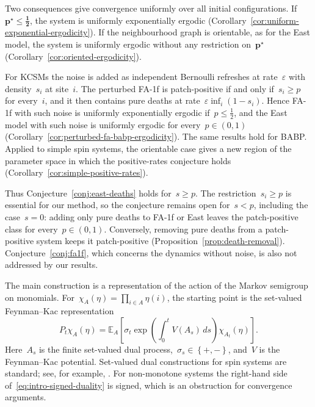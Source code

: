 \documentclass[EJP,preprint,NODS,nobera]{ejpecp}
\newcommand{\E}{\mathbb{E}}
\newcommand{\bb}[1]{\left(#1\right)}
\newcommand{\Cb}[1]{\left[#1\right]}
\newcommand{\cb}[1]{\left\{#1\right\}}
\newcommand{\mb}[1]{\mathbf{#1}}
\newcommand{\mbs}[1]{\boldsymbol{#1}}
\begin{document}
Two consequences give convergence uniformly over all initial configurations.
If~$\mb p^\star\leq\mbs{\tfrac12}$, the system is uniformly exponentially
ergodic (Corollary~\ref{cor:uniform-exponential-ergodicity}). If the
neighbourhood graph is orientable, as for the East model, the system is
uniformly ergodic without any restriction on~$\mb p^\star$
(Corollary~\ref{cor:oriented-ergodicity}).

For KCSMs the noise is added as independent Bernoulli refreshes at
rate~$\varepsilon$ with density~$s_i$ at site~$i$. The perturbed FA-1f is
patch-positive if and only if~$s_i\geq p$ for every~$i$, and it then contains
pure deaths at rate~$\varepsilon\inf_i(1-s_i)$. Hence FA-1f with such noise
is uniformly exponentially ergodic if~$p\leq\tfrac12$, and the East model
with such noise is uniformly ergodic for every~$p\in(0,1)$
(Corollary~\ref{cor:perturbed-fa-babp-ergodicity}). The same results hold for BABP. Applied to
simple spin systems, the orientable case gives a new region of the parameter
space in which the positive-rates conjecture holds
(Corollary~\ref{cor:simple-positive-rates}).

Thus Conjecture~\ref{conj:east-deaths} holds for~$s\geq p$. The
restriction~$s_i\geq p$ is essential for our method, so the conjecture
remains open for~$s<p$, including the case~$s=0$: adding only pure deaths to
FA-1f or East leaves the patch-positive class for every~$p\in(0,1)$. Conversely, removing pure deaths from a patch-positive
system keeps it patch-positive (Proposition~\ref{prop:death-removal}).
Conjecture~\ref{conj:fa1f}, which concerns the dynamics without noise, is
also not addressed by our results.

The main construction is a representation of the action of the Markov
semigroup on monomials. For~$\chi_A(\eta)=\prod_{i\in A}\eta(i)$, the
starting point is the set-valued Feynman--Kac representation
\begin{equation}
\label{eq:intro-signed-duality}
P_t\chi_A(\eta)
=
\E_A\Cb{
\sigma_t
\exp\bb{\int_0^t V(A_s)\,ds}
\chi_{A_t}(\eta)
}.
\end{equation}
Here~$A_s$ is the finite set-valued dual process,~$\sigma_s\in\cb{+,-}$, and~$V$
is the Feynman--Kac potential. Set-valued dual constructions for spin systems
are standard; see, for example,
\cite{Harris1974,Harris1978,Griffeath1979,HolleyStroock1979,Gray1986,JansenKurt2014}.
For non-monotone systems the right-hand side
of~\eqref{eq:intro-signed-duality} is signed, which is an obstruction for
convergence arguments. 
\end{document}
